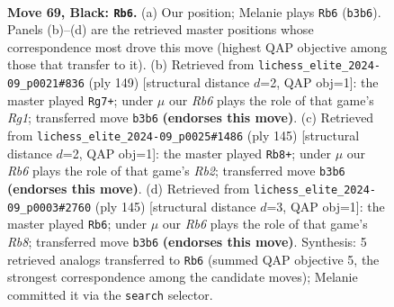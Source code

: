 \documentclass[11pt]{article}
\begin{document}
\clearpage

\begin{figure}[p]\centering
\begin{subfigure}{0.46\textwidth}\centering
\resizebox{\linewidth}{!}{%
\newchessgame
\chessboard[
  setfen={4R3/6k1/8/8/5K2/1r6/7P/3r4 b - - 6 69},
  showmover=false,
  pgfstyle=straightmove, color=movearrow, markmove={b3-b6}
]}
\caption{}
\end{subfigure}\hfill
\begin{subfigure}{0.46\textwidth}\centering
\resizebox{\linewidth}{!}{%
\newchessgame
\chessboard[
  setfen={6r1/P1K5/5R2/1k6/8/8/8/8 b - - 6 75},
  showmover=false,
  pgfstyle=straightmove, color=movearrow, markmove={g8-g7}
]}
\caption{}
\end{subfigure}
\\[4pt]
\begin{subfigure}{0.46\textwidth}\centering
\resizebox{\linewidth}{!}{%
\newchessgame
\chessboard[
  setfen={6K1/1r6/7P/R7/6k1/8/8/8 b - - 4 73},
  showmover=false,
  pgfstyle=straightmove, color=movearrow, markmove={b7-b8}
]}
\caption{}
\end{subfigure}\hfill
\begin{subfigure}{0.46\textwidth}\centering
\resizebox{\linewidth}{!}{%
\newchessgame
\chessboard[
  setfen={K7/4k3/P7/8/8/8/3R4/1r6 b - - 12 73},
  showmover=false,
  pgfstyle=straightmove, color=movearrow, markmove={b1-b6}
]}
\caption{}
\end{subfigure}
\caption{\textbf{Move 69, Black: \texttt{Rb6}.} (a) Our position; Melanie plays \texttt{Rb6} (\texttt{b3b6}). Panels (b)--(d) are the retrieved master positions whose correspondence most drove this move (highest QAP objective among those that transfer to it). (b) Retrieved from \texttt{lichess\_elite\_2024-09\_p0021\#836} (ply 149) [structural distance $d$=2, QAP obj=1]: the master played \texttt{Rg7+}; under $\mu$ our \emph{Rb6} plays the role of that game's \emph{Rg1}; transferred move \texttt{b3b6} \textbf{(endorses this move)}. (c) Retrieved from \texttt{lichess\_elite\_2024-09\_p0025\#1486} (ply 145) [structural distance $d$=2, QAP obj=1]: the master played \texttt{Rb8+}; under $\mu$ our \emph{Rb6} plays the role of that game's \emph{Rb2}; transferred move \texttt{b3b6} \textbf{(endorses this move)}. (d) Retrieved from \texttt{lichess\_elite\_2024-09\_p0003\#2760} (ply 145) [structural distance $d$=3, QAP obj=1]: the master played \texttt{Rb6}; under $\mu$ our \emph{Rb6} plays the role of that game's \emph{Rb8}; transferred move \texttt{b3b6} \textbf{(endorses this move)}. Synthesis: 5 retrieved analogs transferred to \texttt{Rb6} (summed QAP objective 5, the strongest correspondence among the candidate moves); Melanie committed it via the \texttt{search} selector.}
\label{fig:thought-m137}
\end{figure}
\end{document}
